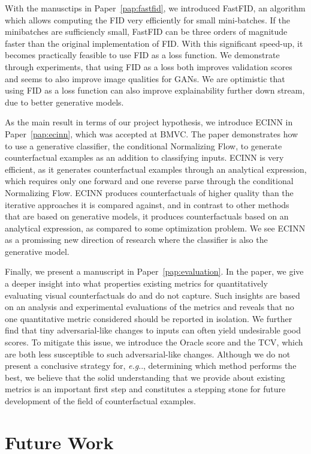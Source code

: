 \documentclass[11pt,a4paper,twoside,openright,final]{memoir}
\makeatletter
\DeclareRobustCommand\onedot{\futurelet\@let@token\@onedot}
\def\@onedot{\ifx\@let@token.\else.\null\fi\xspace}
\def\eg{\emph{e.g}\onedot} \def\Eg{\emph{E.g}\onedot}
\newcommand*{\paperref}[1]{Paper~\hyperref[#1]{\ref{#1}}}
\makeatother
\begin{document}
With the manusctips in \paperref{pap:fastfid}, we introduced FastFID,  an algorithm which allows computing the FID very efficiently for small mini-batches.
If the minibatches are sufficiencly small, FastFID can be three orders of magnitude faster than the original implementation of FID. 
With this significant speed-up, it becomes practically feasible to use FID as a loss function. 
We demonstrate through experiments, that using FID as a loss both improves validation scores and seems to also improve image qualities for GANs.
We are optimistic that using FID as a loss function can also improve explainability further down stream, due to better generative models.

As the main result in terms of our project hypothesis, we introduce ECINN in \paperref{pap:ecinn},  which was accepted at BMVC.
The paper demonstrates how to use a generative classifier, the conditional Normalizing Flow, to generate counterfactual examples as an addition to classifying inputs. 
ECINN is very efficient, as it generates counterfactual examples through an analytical expression, which requires only one forward and one reverse parse through the conditional Normalizing Flow.
ECINN produces counterfactuals of higher quality than the iterative approaches it is compared against, and in contrast to other methods that are based on generative models, it produces counterfactuals based on an analytical expression, as compared to some optimization problem.
We see ECINN as a promissing new direction of research where the classifier is also the generative model.

Finally, we present a manuscript in \paperref{pap:evaluation}.
In the paper, we give a deeper insight into what properties existing metrics for quantitatively evaluating visual counterfactuals do and do not capture.
Such insights are based on an analysis and experimental evaluations of the metrics and reveals that no one quantitative metric considered should be reported in isolation.
We further find that tiny adversarial-like changes to inputs can often yield undesirable good scores. 
To mitigate this issue, we introduce the Oracle score and the TCV, which are both less susceptible to such adversarial-like changes. 
Although we do not present a conclusive strategy for, \eg, determining which method performs the best, we believe that the solid understanding that we provide about existing metrics is an important first step and constitutes a stepping stone for future development of the field of counterfactual examples.

\section{Future Work}\label{sec:conclusion-future-work}
\end{document}
